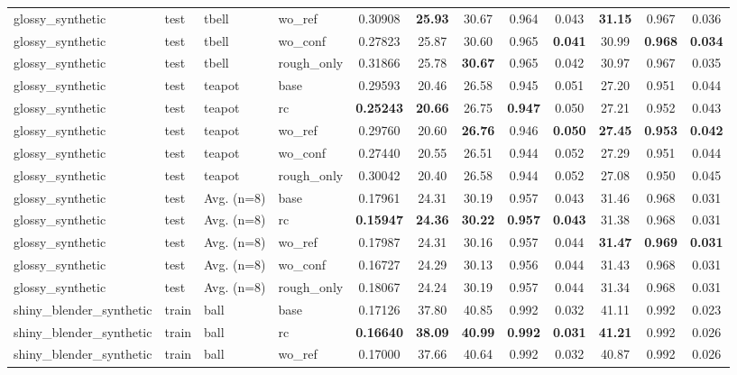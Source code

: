 \begin{table}[t]
{\begin{tabular}{llllcccccccc}
glossy\_synthetic & test & tbell & wo\_ref & 0.30908 & \textbf{25.93} & 30.67 & 0.964 & 0.043 & \textbf{31.15} & 0.967 & 0.036 \\
glossy\_synthetic & test & tbell & wo\_conf & 0.27823 & 25.87 & 30.60 & 0.965 & \textbf{0.041} & 30.99 & \textbf{0.968} & \textbf{0.034} \\
glossy\_synthetic & test & tbell & rough\_only & 0.31866 & 25.78 & \textbf{30.67} & 0.965 & 0.042 & 30.97 & 0.967 & 0.035 \\
glossy\_synthetic & test & teapot & base & 0.29593 & 20.46 & 26.58 & 0.945 & 0.051 & 27.20 & 0.951 & 0.044 \\
glossy\_synthetic & test & teapot & rc & \textbf{0.25243} & \textbf{20.66} & 26.75 & \textbf{0.947} & 0.050 & 27.21 & 0.952 & 0.043 \\
glossy\_synthetic & test & teapot & wo\_ref & 0.29760 & 20.60 & \textbf{26.76} & 0.946 & \textbf{0.050} & \textbf{27.45} & \textbf{0.953} & \textbf{0.042} \\
glossy\_synthetic & test & teapot & wo\_conf & 0.27440 & 20.55 & 26.51 & 0.944 & 0.052 & 27.29 & 0.951 & 0.044 \\
glossy\_synthetic & test & teapot & rough\_only & 0.30042 & 20.40 & 26.58 & 0.944 & 0.052 & 27.08 & 0.950 & 0.045 \\
glossy\_synthetic & test & Avg. (n=8) & base & 0.17961 & 24.31 & 30.19 & 0.957 & 0.043 & 31.46 & 0.968 & 0.031 \\
glossy\_synthetic & test & Avg. (n=8) & rc & \textbf{0.15947} & \textbf{24.36} & \textbf{30.22} & \textbf{0.957} & \textbf{0.043} & 31.38 & 0.968 & 0.031 \\
glossy\_synthetic & test & Avg. (n=8) & wo\_ref & 0.17987 & 24.31 & 30.16 & 0.957 & 0.044 & \textbf{31.47} & \textbf{0.969} & \textbf{0.031} \\
glossy\_synthetic & test & Avg. (n=8) & wo\_conf & 0.16727 & 24.29 & 30.13 & 0.956 & 0.044 & 31.43 & 0.968 & 0.031 \\
glossy\_synthetic & test & Avg. (n=8) & rough\_only & 0.18067 & 24.24 & 30.19 & 0.957 & 0.044 & 31.34 & 0.968 & 0.031 \\
\midrule
shiny\_blender\_synthetic & train & ball & base & 0.17126 & 37.80 & 40.85 & 0.992 & 0.032 & 41.11 & 0.992 & 0.023 \\
shiny\_blender\_synthetic & train & ball & rc & \textbf{0.16640} & \textbf{38.09} & \textbf{40.99} & \textbf{0.992} & \textbf{0.031} & \textbf{41.21} & 0.992 & 0.026 \\
shiny\_blender\_synthetic & train & ball & wo\_ref & 0.17000 & 37.66 & 40.64 & 0.992 & 0.032 & 40.87 & 0.992 & 0.026 \\

\end{tabular}}
\end{table}
